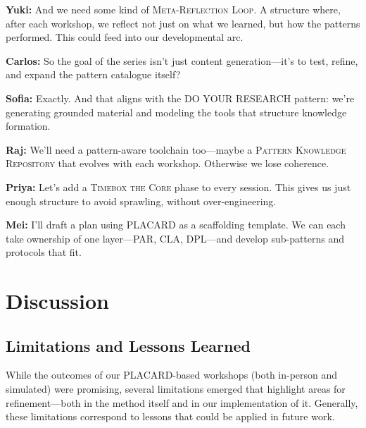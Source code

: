 \documentclass[acmlarge,timestamp]{acmart}
\begin{document}
{{\begin{minipage}{.7\pagewidth}
\noindent\textbf{Yuki:} And we need some kind of {\scshape Meta-Reflection Loop}. A structure where, after each workshop, we reflect not just on what we learned, but how the patterns performed. This could feed into our developmental arc.

\noindent\textbf{Carlos:} So the goal of the series isn’t just content generation—it’s to test, refine, and expand the pattern catalogue itself?

\noindent\textbf{Sofia:} Exactly. And that aligns with the DO YOUR RESEARCH pattern: we’re generating grounded material and modeling the tools that structure knowledge formation.

\noindent\textbf{Raj:} We’ll need a pattern-aware toolchain too—maybe a {\scshape Pattern Knowledge Repository} that evolves with each workshop. Otherwise we lose coherence.

\noindent\textbf{Priya:} Let’s add a {\scshape Timebox the Core} phase to every session. This gives us just enough structure to avoid sprawling, without over-engineering.

\noindent\textbf{Mei:} I’ll draft a plan using PLACARD as a scaffolding template. We can each take ownership of one layer—PAR, CLA, DPL—and develop sub-patterns and protocols that fit.
\end{minipage}}

\section{Discussion}\label{sec:discussion}

\subsection{Limitations and Lessons Learned}

While the outcomes of our PLACARD-based workshops (both in-person and
simulated) were promising, several limitations emerged that highlight
areas for refinement---both in the method itself and in our
implementation of it.  Generally, these limitations correspond to
lessons that could be applied in future work.

}
\end{document}
